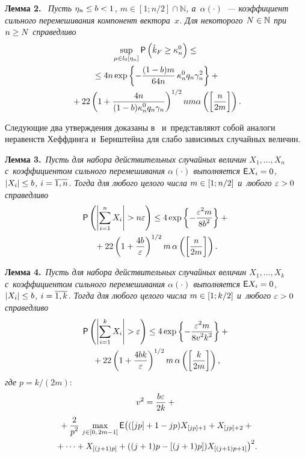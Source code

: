 \begin{multicols}{2}
\smallskip

\noindent
\textbf{Лемма 2.}\ 
\textit{Пусть $\eta_n \hm\leq b\hm<1$, $m\in[1;n/2]\cap\mathbb{N}$, а~$\alpha(\cdot)$~--- 
коэффициент сильного перемешивания компонент вектора~$x$. Для некоторого 
$N\hm\in\mathbb{N}$ при $n \hm\geq N$ справедливо}
\begin{multline*}
\sup\limits_{\mu\in l_0[\eta_n]} {\sf P} \left(\hat{k}_F \geq \kappa_n^0 \right) 
\leq{}\\
{}\leq 4 n \exp\left\{-\displaystyle\frac{\displaystyle (1-b)m\mathstrut}{\displaystyle 64n\mathstrut}\,  \kappa_n^0 q_n \gamma_n^2    
\right\}+{}\\
{}+ 22\left(1+\displaystyle\frac{\displaystyle 4n\mathstrut}{\displaystyle (1-b)\kappa_n^0 q_n \gamma_n\mathstrut}\right)^{1/2} n m 
\alpha\left(\left[\displaystyle\frac{\displaystyle n\mathstrut}{\displaystyle 2m\mathstrut}\right]\right).
\end{multline*}

Следующие два утверждения доказаны в~\cite{Bosq} и~представляют собой аналоги 
неравенств Хеффдинга и~Бернштейна для слабо зависимых случайных величин.


\smallskip

\noindent
\textbf{Лемма 3.}\
\textit{Пусть для набора действительных случайных величин $X_1, \ldots, X_n$ 
с~коэффициентом сильного перемешивания $\alpha(\cdot)$ выполняется ${\mathsf E} X_i \hm=0$, 
$|X_i|\hm\leq b$, $i\hm=\overline{1,n}$. Тогда для любого целого числа $m\hm\in[1; n/2]$ 
и~любого $\eps\hm>0$ справедливо}
\begin{multline*}
{\sf P}\left(\left|\sum\limits_{i=1}^n X_i\right| > n\varepsilon \right) \leq 4 
\exp\left\{-\displaystyle\frac{\displaystyle \varepsilon^2 m\mathstrut}{\displaystyle 8 b^2\mathstrut}\right\}+ {}\\
{}+
22\left(1+\displaystyle\frac{\displaystyle 4b\mathstrut}{\displaystyle \varepsilon\mathstrut}\right)^{1/2} m\, 
\alpha\left(\left[\displaystyle\frac{\displaystyle n\mathstrut}{\displaystyle 2m\mathstrut}\right]\right).
\end{multline*}


\smallskip

\noindent
\textbf{Лемма 4.}\
\textit{Пусть для набора действительных случайных величин $X_1, \ldots, X_k$ 
с~коэффициентом сильного перемешивания $\alpha(\cdot)$ выполняется ${\mathsf E} X_i \hm=0$, 
$|X_i|\hm\leq b$, $i\hm=\overline{1,k}$. Тогда для любого целого числа $m\hm\in[1; k/2]$ 
и~любого $\eps\hm>0$ справедливо}
\begin{multline*}
{\sf P}\left(\left|\sum\limits_{i=1}^k X_i\right| > \varepsilon \right) \leq 4 
\exp\left\{-\displaystyle\frac{\displaystyle \varepsilon^2 m\mathstrut}{\displaystyle 8 v^2 k^2\mathstrut}\right\}+{}\\
{}+ 22\left(1+\displaystyle\frac{\displaystyle 4bk\mathstrut}{\displaystyle \varepsilon\mathstrut}\right)^{1/2} m\, 
\alpha\left(\left[\displaystyle\frac{\displaystyle k\mathstrut}{\displaystyle 2m\mathstrut}\right]\right),
\end{multline*}
\textit{где $p = k/(2m)$}:
\begin{multline*}
v^2 =
 \displaystyle\frac{\displaystyle b \varepsilon\mathstrut}{\displaystyle 2k\mathstrut} + {}\\
 {}+\displaystyle\frac{\displaystyle 2\mathstrut}{\displaystyle p^2\mathstrut} \,  \max\limits_{ j\in[0,\,2m-1]} 
{\mathsf E} \big( ([jp]+1-jp)X_{[jp]+1} + X_{[jp]+2}+{}\\
{}+ \cdots +  X_{[(j+1)p]} + ((j+1)p-[(j+1)p])X_{[(j+1)p+1]}\big)^2.
\end{multline*}


\end{multicols}
